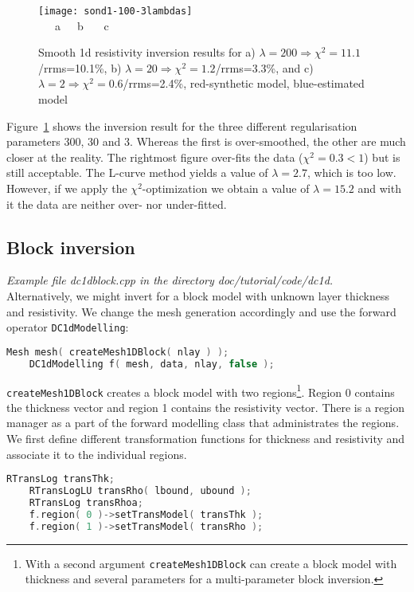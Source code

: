 \begin{figure}[htbp]
\texttt{[image: sond1-100-3lambdas]}\\[-3ex]
~~~a\hfill ~~~b \hfill ~~~c \hfill ~
\caption{Smooth 1d resistivity inversion results for a) $\lambda=200\Rightarrow \chi^2=11.1$/rrms=10.1\%, b) $\lambda=20\Rightarrow \chi^2=1.2$/rrms=3.3\%, and c) $\lambda=2\Rightarrow \chi^2=0.6$/rrms=2.4\%, red-synthetic model, blue-estimated model}\label{fig:dc1d-3lambda}
\end{figure}

Figure~\ref{fig:dc1d-3lambda} shows the inversion result for the three different regularisation parameters 300, 30 and 3.
Whereas the first is over-smoothed, the other are much closer at the reality.
The rightmost figure over-fits the data ($\chi^2=0.3<1$) but is still acceptable.
The L-curve method yields a value of $\lambda=2.7$, which is too low.
However, if we apply the $\chi^2$-optimization we obtain a value of $\lambda=15.2$ and with it the data are neither over- nor under-fitted.

\subsection{Block inversion}\label{sec:dc1dblock}
{\em Example file dc1dblock.cpp in the directory doc/tutorial/code/dc1d.}\\
Alternatively, we might invert for a block model with unknown layer thickness and resistivity.
We change the mesh generation accordingly and use the forward operator \lstinline|DC1dModelling|:
\begin{lstlisting}[language=C++]
    Mesh mesh( createMesh1DBlock( nlay ) );
    DC1dModelling f( mesh, data, nlay, false );
\end{lstlisting}

\lstinline|createMesh1DBlock| creates a block model with two regions\footnote{With a second argument \lstinline|createMesh1DBlock| can create a block model with thickness and several parameters for a multi-parameter block inversion.}.
Region 0 contains the thickness vector and region 1 contains the resistivity vector.
There is a region manager as a part of the forward modelling class that administrates the regions.
We first define different transformation functions for thickness and resistivity and associate it to the individual regions.
\begin{lstlisting}[language=C++]
    RTransLog transThk;
    RTransLogLU transRho( lbound, ubound );
    RTransLog transRhoa;
    f.region( 0 )->setTransModel( transThk );
    f.region( 1 )->setTransModel( transRho );
\end{lstlisting}

